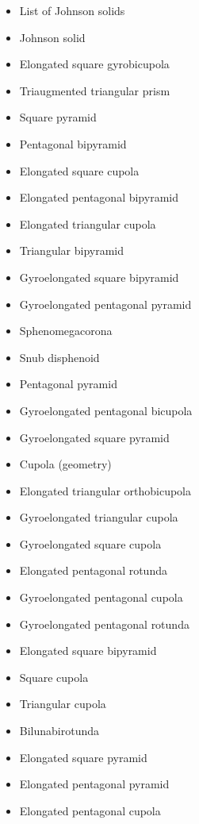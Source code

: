 
\begin{itemize}
\item List of Johnson solids 
\item Johnson solid 
\item Elongated square gyrobicupola 
\item Triaugmented triangular prism 
\item Square pyramid 
\item Pentagonal bipyramid 
\item Elongated square cupola 
\item Elongated pentagonal bipyramid 
\item Elongated triangular cupola 
\item Triangular bipyramid 
\item Gyroelongated square bipyramid 
\item Gyroelongated pentagonal pyramid 
\item Sphenomegacorona 
\item Snub disphenoid 
\item Pentagonal pyramid 
\item Gyroelongated pentagonal bicupola 
\item Gyroelongated square pyramid 
\item Cupola (geometry) 
\item Elongated triangular orthobicupola 
\item Gyroelongated triangular cupola 
\item Gyroelongated square cupola 
\item Elongated pentagonal rotunda 
\item Gyroelongated pentagonal cupola 
\item Gyroelongated pentagonal rotunda 
\item Elongated square bipyramid 
\item Square cupola 
\item Triangular cupola 
\item Bilunabirotunda 
\item Elongated square pyramid 
\item Elongated pentagonal pyramid 
\item Elongated pentagonal cupola 

\end{itemize}
